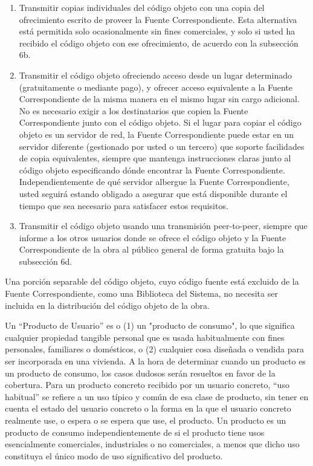 \documentclass[11pt]{article}
\begin{document}
\begin{enumerate}
\begin{enumerate}
  \item Transmitir copias individuales del c\'{o}digo objeto con una copia 
    del ofrecimiento escrito de proveer la Fuente Correspondiente.  Esta 
    alternativa est\'{a} permitida solo ocasionalmente sin fines comerciales, 
    y solo si usted ha recibido el c\'{o}digo objeto con ese ofrecimiento, 
    de acuerdo con la subsecci\'{o}n 6b.

  \item Transmitir el c\'{o}digo objeto ofreciendo acceso desde un lugar 
    determinado (gratuitamente o mediante pago), y ofrecer acceso 
    equivalente a la Fuente Correspondiente de la misma manera en el 
    mismo lugar sin cargo adicional. No es necesario exigir a los 
    destinatarios que copien la Fuente Correspondiente junto con el 
    c\'{o}digo objeto.  Si el lugar para copiar el c\'{o}digo objeto es un 
    servidor de red, la Fuente Correspondiente puede estar en un 
    servidor diferente (gestionado por usted o un tercero) que soporte 
    facilidades de copia equivalentes, siempre que mantenga 
    instrucciones claras junto al c\'{o}digo objeto especificando d\'{o}nde 
    encontrar la Fuente Correspondiente. Independientemente de qu\'{e} 
    servidor albergue la Fuente Correspondiente, usted seguir\'{a} estando 
    obligado a asegurar que est\'{a} disponible durante el tiempo que 
    sea necesario para satisfacer estos requisitos.

  \item Transmitir el c\'{o}digo objeto usando una transmisi\'{o}n peer-to-peer, 
    siempre que informe a los otros usuarios donde se ofrece el c\'{o}digo 
    objeto y la Fuente Correspondiente de la obra al p\'{u}blico general de 
    forma gratuita bajo la subsecci\'{o}n 6d.
  \end{enumerate}

Una porci\'{o}n separable del c\'{o}digo objeto, cuyo c\'{o}digo fuente est\'{a} 
excluido de la Fuente Correspondiente, como una Biblioteca del Sistema, 
no necesita ser incluida en la distribuci\'{o}n del c\'{o}digo objeto de la obra.

Un ``Producto de Usuario'' es o (1) un "producto de consumo", lo que 
significa cualquier propiedad tangible personal que es usada 
habitualmente con fines personales, familiares o dom\'{e}sticos, o (2) 
cualquier cosa dise\~nada o vendida para ser incorporada en una vivienda.  
A la hora de determinar cuando un producto es un producto de consumo, 
los casos dudosos ser\'{a}n resueltos en favor de la cobertura.  Para un 
producto concreto recibido por un usuario concreto, ``uso habitual'' se 
refiere a un uso t\'{i}pico y com\'{u}n de esa clase de producto, sin tener en 
cuenta el estado del usuario concreto o la forma en la que el usuario 
concreto realmente use, o espera o se espera que use, el producto.  Un 
producto es un producto de consumo independientemente de si el producto 
tiene usos esencialmente comerciales, industriales o no comerciales, a 
menos que dicho uso constituya el \'{u}nico modo de uso significativo del 
producto.


\end{enumerate}
\end{document}
